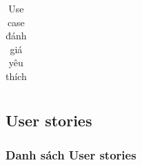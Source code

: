 \documentclass[12pt,a4paper]{article}
\begin{document}
\begin{table}[H]
\begin{tabular}{|p{3.5cm}|p{11.5cm}|c|}
            \\ \hline
        \end{tabular}
        \caption{Use case đánh giá yêu thích}

    \end{table}

    \subsection{User stories}

    \subsubsection{Danh sách User stories}
\end{document}
